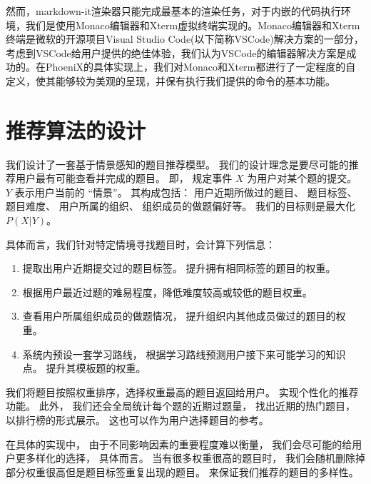 然而，markdown-it渲染器只能完成最基本的渲染任务，对于内嵌的代码执行环境，我们是使用Monaco编辑器和Xterm虚拟终端实现的。Monaco编辑器和Xterm终端是微软的开源项目Visual Studio Code(以下简称VSCode)解决方案的一部分，考虑到VSCode给用户提供的绝佳体验，我们认为VSCode的编辑器解决方案是成功的。在PhoeniX的具体实现上，我们对Monaco和Xterm都进行了一定程度的自定义，使其能够较为美观的呈现，并保有执行我们提供的命令的基本功能。

\section{推荐算法的设计}

我们设计了一套基于情景感知的题目推荐模型。 我们的设计理念是要尽可能的推荐用户最有可能查看并完成的题目。 即， 规定事件 $X$ 为用户对某个题的提交。 $Y$ 表示用户当前的 “情景”。 其构成包括： 用户近期所做过的题目、 题目标签、 题目难度、 用户所属的组织、 组织成员的做题偏好等。 我们的目标则是最大化 $P(X|Y)$。

具体而言，我们针对特定情境寻找题目时，会计算下列信息：

\begin{enumerate}
    \item 提取出用户近期提交过的题目标签。 提升拥有相同标签的题目的权重。
    \item 根据用户最近过题的难易程度，降低难度较高或较低的题目权重。
    \item 查看用户所属组织成员的做题情况， 提升组织内其他成员做过的题目的权重。
    \item 系统内预设一套学习路线， 根据学习路线预测用户接下来可能学习的知识点。 提升其模板题的权重。
\end{enumerate}

我们将题目按照权重排序，选择权重最高的题目返回给用户。 实现个性化的推荐功能。 此外， 我们还会全局统计每个题的近期过题量， 找出近期的热门题目， 以排行榜的形式展示。 这也可以作为用户选择题目的参考。

在具体的实现中， 由于不同影响因素的重要程度难以衡量， 我们会尽可能的给用户更多样化的选择， 具体而言。 当有很多权重很高的题目时， 我们会随机删除掉部分权重很高但是题目标签重复出现的题目。 来保证我们推荐的题目的多样性。
